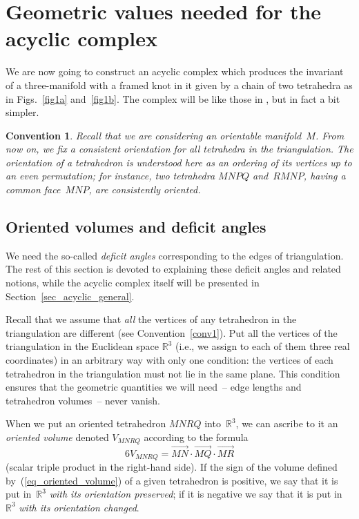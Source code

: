 \documentclass[11pt]{article}
\newtheorem{convention}{Convention}}
\begin{document}
\section{Geometric values needed for the acyclic complex}
\label{sec_deficit_angles}

We are now going to construct an acyclic complex which produces the invariant of a three-manifold with a framed knot in it given by a chain of two tetrahedra as in Figs.~\ref{fig1a} and~\ref{fig1b}. The complex will be like those in \cite{TMP24, TMP15}, but in fact a bit simpler.

\begin{convention}
\label{conv2}
Recall that we are considering an \emph{orientable} manifold~$M$. From now on, we f\/ix a \emph{consistent orientation} for all tetrahedra in the triangulation. The orientation of a tetrahedron is understood here as an ordering of its vertices up to an even permutation; for instance, two tetrahedra $MNPQ$ and~$RMNP$, having a common face~$MNP$, are consistently oriented.
\end{convention}

\subsection{Oriented volumes and def\/icit angles}
\label{subs_daav}
We need the so-called \emph{deficit angles} corresponding to the edges of triangulation. The rest of this section is devoted to explaining these def\/icit angles and related notions, while the acyclic complex itself will be presented in Section~\ref{sec_acyclic_general}.

Recall that we assume that \emph{all} the vertices of any tetrahedron in the triangulation are dif\/ferent (see Convention~\ref{conv1}). Put all the vertices of the triangulation in the Euclidean space $\mathbb R^3$ (i.e., we assign to each of them three real coordinates) in an arbitrary way with only one condition: the vertices of each tetrahedron in the triangulation must not lie in the same plane. This condition ensures that the geometric quantities we will need~-- edge lengths and tetrahedron volumes~-- never vanish.

When we put an oriented tetrahedron $MNRQ$ into~$\mathbb R^3$, we can ascribe to it an \emph{oriented volume} denoted $V_{MNRQ}$ according to the formula
\begin{equation}
6V_{MNRQ}=\overrightarrow{MN} \cdot \overrightarrow{MQ} \cdot \overrightarrow{MR}
\label{eq_oriented_volume}
\end{equation}
(scalar triple product in the right-hand side). If the sign of the volume def\/ined by~(\ref{eq_oriented_volume}) of a given tetrahedron is positive, we say that it is put in~$\mathbb R^3$ \emph{with its orientation preserved}; if it is negative we say that it is put in~$\mathbb R^3$ \emph{with its orientation changed}.
\end{document}
